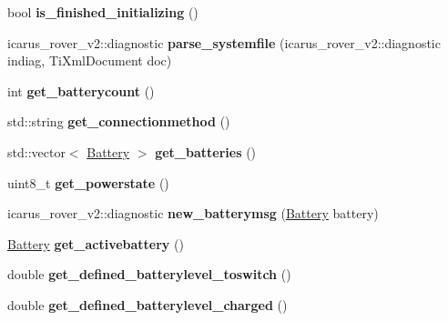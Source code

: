 \begin{DoxyCompactItemize}
bool {\bfseries is\+\_\+finished\+\_\+initializing} ()
\item 
\mbox{\label{classPowerMonitorNodeProcess_a622b548fb44f1673b905f87402333fb7}} 
icarus\+\_\+rover\+\_\+v2\+::diagnostic {\bfseries parse\+\_\+systemfile} (icarus\+\_\+rover\+\_\+v2\+::diagnostic indiag, Ti\+Xml\+Document doc)
\item 
\mbox{\label{classPowerMonitorNodeProcess_adfc351c4ed5e34a91322081aa8bd87e5}} 
int {\bfseries get\+\_\+batterycount} ()
\item 
\mbox{\label{classPowerMonitorNodeProcess_a65c2d66282d32a862e244d396336e522}} 
std\+::string {\bfseries get\+\_\+connectionmethod} ()
\item 
\mbox{\label{classPowerMonitorNodeProcess_abf77a4835a916dc7b6779b43704caffb}} 
std\+::vector$<$ \hyperlink{structBattery}{Battery} $>$ {\bfseries get\+\_\+batteries} ()
\item 
\mbox{\label{classPowerMonitorNodeProcess_a8cee816228401bfeabe1b03142098839}} 
uint8\+\_\+t {\bfseries get\+\_\+powerstate} ()
\item 
\mbox{\label{classPowerMonitorNodeProcess_af40fbdc510cb5645c010cf5a5ef59d10}} 
icarus\+\_\+rover\+\_\+v2\+::diagnostic {\bfseries new\+\_\+batterymsg} (\hyperlink{structBattery}{Battery} battery)
\item 
\mbox{\label{classPowerMonitorNodeProcess_a873e6189d0c6c2c8941f80b65d517155}} 
\hyperlink{structBattery}{Battery} {\bfseries get\+\_\+activebattery} ()
\item 
\mbox{\label{classPowerMonitorNodeProcess_a3929137406e19612f3fd0305f39647dc}} 
double {\bfseries get\+\_\+defined\+\_\+batterylevel\+\_\+toswitch} ()
\item 
\mbox{\label{classPowerMonitorNodeProcess_a85971b4e35faec33d432d312d3b79de4}} 
double {\bfseries get\+\_\+defined\+\_\+batterylevel\+\_\+charged} ()
\item 

\end{DoxyCompactItemize}
